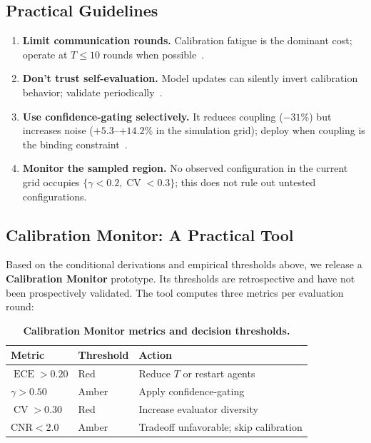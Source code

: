 \documentclass[11pt]{article}
\DeclareMathOperator{\CV}{CV}
\DeclareMathOperator{\ECE}{ECE}
\begin{document}
\subsection{Practical Guidelines}

\begin{enumerate}[leftmargin=*,nosep]
    \item \textbf{Limit communication rounds.} Calibration fatigue is the dominant cost; operate at $T \leq 10$ rounds when possible~\citep{li2025sacd}.
    \item \textbf{Don't trust self-evaluation.} Model updates can silently invert calibration behavior; validate periodically~\citep{zhou2024incontext}.
    \item \textbf{Use confidence-gating selectively.} It reduces coupling ($-31\%$) but increases noise ($+5.3$--$+14.2\%$ in the simulation grid); deploy when coupling is the binding constraint~\citep{chen2025unicr}.
    \item \textbf{Monitor the sampled region.} No observed configuration in the current grid occupies $\{\gamma < 0.2, \CV < 0.3\}$; this does not rule out untested configurations.
\end{enumerate}

\subsection{Calibration Monitor: A Practical Tool}

Based on the conditional derivations and empirical thresholds above, we release a \textbf{Calibration Monitor} prototype. Its thresholds are retrospective and have not been prospectively validated. The tool computes three metrics per evaluation round:

\begin{table}[H]
\centering
\caption{\textbf{Calibration Monitor metrics and decision thresholds.}}
\begin{tabular}{@{}lll@{}}
\toprule
Metric & Threshold & Action \\
\midrule
$\ECE > 0.20$ & Red & Reduce $T$ or restart agents \\
$\gamma > 0.50$ & Amber & Apply confidence-gating \\
$\CV > 0.30$ & Red & Increase evaluator diversity \\
$\text{CNR} < 2.0$ & Amber & Tradeoff unfavorable; skip calibration \\
\bottomrule
\end{tabular}
\end{table}
\end{document}
